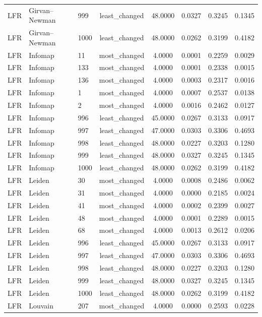 \begin{longtable}{lllccccc}
LFR & Girvan--Newman & 999 & least\_changed & 48.0000 & 0.0327 & 0.3245 & 0.1345 \\
LFR & Girvan--Newman & 1000 & least\_changed & 48.0000 & 0.0262 & 0.3199 & 0.4182 \\
LFR & Infomap & 11 & most\_changed & 4.0000 & 0.0001 & 0.2259 & 0.0029 \\
LFR & Infomap & 133 & most\_changed & 4.0000 & 0.0001 & 0.2338 & 0.0015 \\
LFR & Infomap & 136 & most\_changed & 4.0000 & 0.0003 & 0.2317 & 0.0016 \\
LFR & Infomap & 1 & most\_changed & 4.0000 & 0.0007 & 0.2537 & 0.0138 \\
LFR & Infomap & 2 & most\_changed & 4.0000 & 0.0016 & 0.2462 & 0.0127 \\
LFR & Infomap & 996 & least\_changed & 45.0000 & 0.0267 & 0.3133 & 0.0917 \\
LFR & Infomap & 997 & least\_changed & 47.0000 & 0.0303 & 0.3306 & 0.4693 \\
LFR & Infomap & 998 & least\_changed & 48.0000 & 0.0227 & 0.3203 & 0.1280 \\
LFR & Infomap & 999 & least\_changed & 48.0000 & 0.0327 & 0.3245 & 0.1345 \\
LFR & Infomap & 1000 & least\_changed & 48.0000 & 0.0262 & 0.3199 & 0.4182 \\
LFR & Leiden & 30 & most\_changed & 4.0000 & 0.0008 & 0.2486 & 0.0062 \\
LFR & Leiden & 31 & most\_changed & 4.0000 & 0.0000 & 0.2185 & 0.0024 \\
LFR & Leiden & 41 & most\_changed & 4.0000 & 0.0002 & 0.2399 & 0.0027 \\
LFR & Leiden & 48 & most\_changed & 4.0000 & 0.0001 & 0.2289 & 0.0015 \\
LFR & Leiden & 68 & most\_changed & 4.0000 & 0.0013 & 0.2612 & 0.0206 \\
LFR & Leiden & 996 & least\_changed & 45.0000 & 0.0267 & 0.3133 & 0.0917 \\
LFR & Leiden & 997 & least\_changed & 47.0000 & 0.0303 & 0.3306 & 0.4693 \\
LFR & Leiden & 998 & least\_changed & 48.0000 & 0.0227 & 0.3203 & 0.1280 \\
LFR & Leiden & 999 & least\_changed & 48.0000 & 0.0327 & 0.3245 & 0.1345 \\
LFR & Leiden & 1000 & least\_changed & 48.0000 & 0.0262 & 0.3199 & 0.4182 \\
LFR & Louvain & 207 & most\_changed & 4.0000 & 0.0000 & 0.2593 & 0.0228 \\

\end{longtable}
